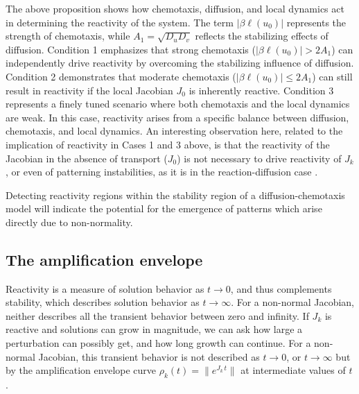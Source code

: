 \documentclass{article}
\newtheorem{proposition}{Proposition}
\newcommand{\jac}{J_{k}}
\begin{document}
The above proposition shows how chemotaxis, diffusion, and local dynamics act in determining the reactivity of the system. The term $|\beta \ell(u_0)|$ represents the strength of chemotaxis, while $A_1 = \sqrt{D_u D_v}$ reflects the stabilizing effects of diffusion. Condition 1 emphasizes that strong chemotaxis ($|\beta \ell(u_0)| > 2A_1$) can independently drive reactivity by overcoming the stabilizing influence of diffusion. Condition 2 demonstrates that moderate chemotaxis ($|\beta \ell(u_0)| \leq 2A_1$) can still result in reactivity if the local Jacobian $J_{0}$ is inherently reactive. Condition 3 represents a finely tuned scenario where both chemotaxis and the local dynamics are weak. In this case, reactivity arises from a specific balance between diffusion, chemotaxis, and local dynamics. {An interesting observation here, related to the implication of reactivity in Cases 1 and 3 above, is that the reactivity of the Jacobian in the absence of transport ($J_{0}$) is not necessary to drive reactivity of $\jac$, or even of patterning instabilities, as it is in the reaction-diffusion case \cite{NEUBERT2002}.}




    




 Detecting reactivity regions within the stability region of a diffusion-chemotaxis model will indicate the potential for the emergence of {patterns which arise directly due to non-normality.}


\subsection{The amplification envelope}
Reactivity is a measure of solution behavior as $t \to
0$, and thus complements stability, which describes
solution behavior as $t \to \infty$. For {a} non-normal Jacobian, neither describes all the transient behavior between zero and infinity. If $\jac$ is reactive and solutions
can grow in magnitude, we can ask how large a perturbation can possibly get, and how long growth can
continue.  For {a} {non-normal} Jacobian, this transient behavior is not described  as $t \to
0$, or $t \to \infty$  but by the amplification envelope curve $\rho_{k}(t)=\|e^{\jac \, t}\|$ at  intermediate values of $t$ \cite{neubert1997alternatives}. 
\end{document}
